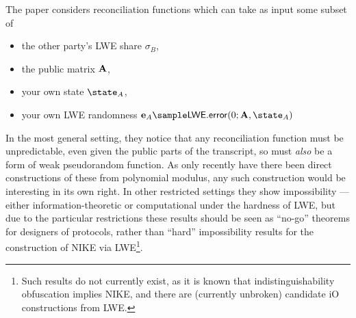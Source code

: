 The paper considers reconciliation functions which can take as input some subset of
\begin{itemize}
	\item the other party's LWE share $\sigma_B$,
	\item the public matrix $\mathbf{A}$,
	\item your own state $\state_A$,
	\item your own LWE randomness $\vfont{e}_A\sample \LWE.\error(0; \mfont{A}, \state_A)$
\end{itemize}
In the most general setting, they notice that any reconciliation function must be unpredictable, even given the public parts of the transcript, so must \emph{also} be a form of weak pseudorandom function.
As only recently \cite{EC:Kim20} have there been direct constructions of these from polynomial modulus, any such construction would be interesting in its own right.
In other restricted settings they show impossibility --- either information-theoretic or computational under the hardness of LWE, but due to the particular restrictions these results should be seen as ``no-go'' theorems for designers of protocols, rather than ``hard'' impossibility results for the construction of NIKE via LWE\footnote{Such results do not currently exist, as it is known that indistinguishability obfuscation implies NIKE, and there are (currently unbroken) candidate iO constructions from LWE\cite{EPRINT:BDGM20a}.}.
